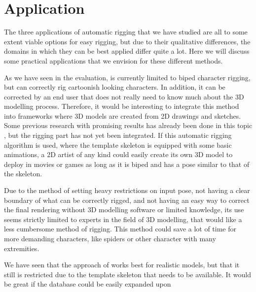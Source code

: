 \documentclass{article}
\begin{document}



\section{Application}
The three applications of automatic rigging that we have studied are all to some
extent viable options for easy rigging, but due to their qualitative differences, 
the domains in which they can be best applied differ quite a lot.
Here we will discuss some practical applications that we envision for these
different methods.

As we have seen in the evaluation, \citep{paper1} is currently limited to biped
character rigging, but can correctly rig cartoonish looking  characters. In addition, it can be
corrected by an end user that does not really need to know much about the 3D
modelling process. Therefore, it would be interesting to integrate this method into
frameworks where 3D models are created from 2D drawings and sketches. Some
previous research with promising results has already been done in this topic
\citep{paper4}, but the rigging part has not yet been integrated. If this automatic rigging
algorithm is used, where the template skeleton is equipped with some basic
animations, a 2D artist of any kind could easily create its own 3D model to
deploy in movies or games as long as it is biped and has a pose similar to that
of the skeleton.

Due to the method of \citep{paper2} setting heavy restrictions on input pose,
not having a clear boundary of what can be correctly rigged, and not
having an easy way to correct the final rendering without 3D modelling software
or limited knowledge, its use seems strictly limited to experts in the field of 3D
modelling, that would like a less cumbersome method of rigging. This method
could save a lot of time for more demanding characters, like spiders or other
character with many extremities.

We have seen that the approach of \citep{paper3} works best for realistic
models, but that it still is restricted due to the template skeleton that needs
to be available. It would be great if the database could be easily expanded upon
\end{document}
